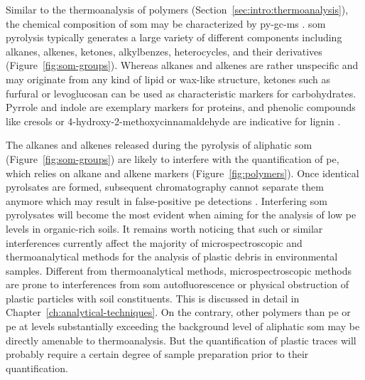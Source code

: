Similar to the thermoanalysis of polymers (Section~\ref{sec:intro:thermoanalysis}), the chemical composition of \ac{som} may be characterized by \ac{py-gc-ms} \citep{CeccantiPyrolysisgas2007,HatcherModern2001}. \Ac{som} pyrolysis typically generates a large variety of different components including alkanes, alkenes, ketones, alkylbenzes, heterocycles, and their derivatives (Figure~\ref{fig:som-groups}). Whereas alkanes and alkenes are rather unspecific and may originate from any kind of lipid or wax-like structure, ketones such as furfural or levoglucosan can be used as characteristic markers for carbohydrates. Pyrrole and indole are exemplary markers for proteins, and phenolic compounds like cresols or 4-hydroxy-2-methoxycinnamaldehyde are indicative for lignin \citep[Figure~\ref{fig:som-groups};][]{HatcherModern2001}.

The alkanes and alkenes released during the pyrolysis of aliphatic \ac{som} (Figure~\ref{fig:som-groups}) are likely to interfere with the quantification of \ac{pe}, which relies on alkane and alkene markers (Figure~\ref{fig:polymers}). Once identical pyrolsates are formed, subsequent chromatography cannot separate them anymore which may result in false-positive \ac{pe} detections \citep{DumichenAnalysis2015}. Interfering \ac{som} pyrolysates will become the most evident when aiming for the analysis of low \ac{pe} levels in organic-rich soils.
It remains worth noticing that such or similar interferences currently affect the majority of microspectroscopic and thermoanalytical methods for the analysis of plastic debris in environmental samples. Different from thermoanalytical methods, microspectroscopic methods are prone to interferences from \ac{som} autofluorescence or physical obstruction of plastic particles with soil constituents. This is discussed in detail in Chapter~\ref{ch:analytical-techniques}.
On the contrary, other polymers than \ac{pe} or \ac{pe} at levels substantially exceeding the background level of aliphatic \ac{som} may be directly amenable to thermoanalysis. But the quantification of plastic traces will probably require a certain degree of sample preparation prior to their quantification.

